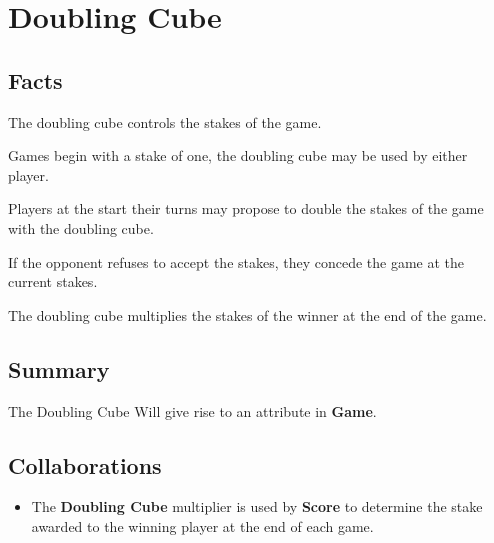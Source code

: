\section{Doubling Cube}

\subsection{Facts}

\begin{dashed}
    \item The doubling cube controls the stakes of the game.
    \item Games begin with a stake of one, the doubling cube may be used by either player.
    \item Players at the start their turns may propose to double the stakes of the game with the doubling cube.
    \item If the opponent refuses to accept the stakes, they concede the game at the current stakes.
    \item The doubling cube multiplies the stakes of the winner at the end of the game.
\end{dashed}

\subsection{Summary}
The Doubling Cube Will give rise to an attribute in \textbf{Game}.

\subsection{Collaborations}

\begin{itemize}
    \item The \textbf{Doubling Cube} multiplier is used by \textbf{Score} to determine the stake awarded to the winning player at the end of each game.
\end{itemize}

